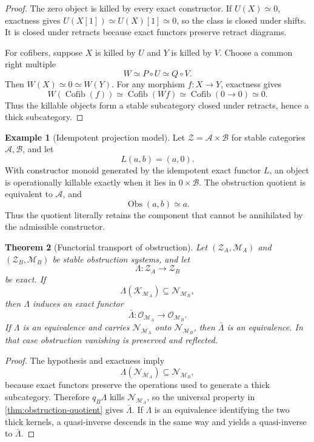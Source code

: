 \documentclass[11pt]{article}
\newtheorem{theorem}{Theorem}[section]
\theoremstyle{definition}
\newtheorem{example}[theorem]{Example}
\theoremstyle{remark}
\newcommand{\Cofib}{\operatorname{Cofib}}
\newcommand{\Obs}{\operatorname{Obs}}
\begin{document}
\begin{proof}
The zero object is killed by every exact constructor. If $U(X)\simeq0$, exactness gives $U(X[1])\simeq U(X)[1]\simeq0$, so the class is closed under shifts. It is closed under retracts because exact functors preserve retract diagrams.

For cofibers, suppose $X$ is killed by $U$ and $Y$ is killed by $V$. Choose a common right multiple
\[
W\simeq P\circ U\simeq Q\circ V.
\]
Then $W(X)\simeq0\simeq W(Y)$. For any morphism $f:X\to Y$, exactness gives
\[
W(\Cofib(f))\simeq\Cofib(Wf)\simeq\Cofib(0\to0)\simeq0.
\]
Thus the killable objects form a stable subcategory closed under retracts, hence a thick subcategory.
\end{proof}

\begin{example}[Idempotent projection model]
Let $\mathcal Z=\mathcal A\times\mathcal B$ for stable categories $\mathcal A,\mathcal B$, and let
\[
L(a,b)=(a,0).
\]
With constructor monoid generated by the idempotent exact functor $L$, an object is operationally killable exactly when it lies in $0\times\mathcal B$. The obstruction quotient is equivalent to $\mathcal A$, and
\[
\Obs(a,b)\simeq a.
\]
Thus the quotient literally retains the component that cannot be annihilated by the admissible constructor.
\end{example}

\begin{theorem}[Functorial transport of obstruction]\label{thm:obstruction-transport}
Let $(\mathcal Z_A,\mathscr M_A)$ and $(\mathcal Z_B,\mathscr M_B)$ be stable obstruction systems, and let
\[
\Lambda:\mathcal Z_A\longrightarrow\mathcal Z_B
\]
be exact. If
\[
\Lambda(\mathcal K_{\mathscr M_A})\subseteq\mathcal N_{\mathscr M_B},
\]
then $\Lambda$ induces an exact functor
\[
\bar\Lambda:\mathcal O_{\mathscr M_A}\longrightarrow\mathcal O_{\mathscr M_B}.
\]
If $\Lambda$ is an equivalence and carries $\mathcal N_{\mathscr M_A}$ onto $\mathcal N_{\mathscr M_B}$, then $\bar\Lambda$ is an equivalence. In that case obstruction vanishing is preserved and reflected.
\end{theorem}

\begin{proof}
The hypothesis and exactness imply
\[
\Lambda(\mathcal N_{\mathscr M_A})\subseteq\mathcal N_{\mathscr M_B},
\]
because exact functors preserve the operations used to generate a thick subcategory. Therefore $q_B\Lambda$ kills $\mathcal N_{\mathscr M_A}$, so the universal property in \cref{thm:obstruction-quotient} gives $\bar\Lambda$. If $\Lambda$ is an equivalence identifying the two thick kernels, a quasi-inverse descends in the same way and yields a quasi-inverse to $\bar\Lambda$.
\end{proof}
\end{document}
